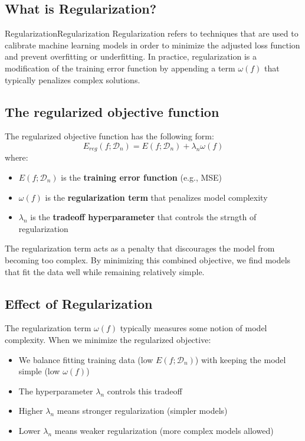 \documentclass[a4paper]{article}
\theoremstyle{definition}
\begin{document}
\subsection{What is Regularization?}
\begin{definition}{Regularization}{Regularization}
Regularization refers to techniques that are used to calibrate machine learning 
models in order to minimize the adjusted loss function and prevent overfitting 
or underfitting.
\vspace{1em}
\noindent
\newline
In practice, regularization is a modification of the training error function by appending a term 
\( \omega(f) \) that typically penalizes complex solutions.
\end{definition}
\subsection{The regularized objective function}
The regularized objective function has the following form:
\[
  E_{reg} (f;\mathcal{D}_n) = E(f;\mathcal{D}_n) + \lambda_n \omega(f)
\]
where:
\begin{itemize}
    \item \( E(f;\mathcal{D}_n) \) is the \textbf{training error function} (e.g., MSE)
    \item \( \omega(f) \) is the \textbf{regularization term} that penalizes model complexity 
    \item \( \lambda_n \) is the \textbf{tradeoff hyperparameter} that controls the strngth of regularization
\end{itemize}
The regularization term acts as a penalty that discourages the model from becoming too complex.
By minimizing this combined objective, we find models that fit the data well while remaining relatively simple.
\subsection{Effect of Regularization}
The regularization term \( \omega(f) \) typically measures some notion of model complexity. When we minimize the regularized objective:
\begin{itemize}
    \item We balance fitting training data (low \(E(f;\mathcal{D}_n) \)) with keeping the model simple (low \( \omega(f) \))
    \item The hyperparameter \( \lambda_n \) controls this tradeoff 
    \item Higher \( \lambda_n \) means stronger regularization (simpler models)
    \item Lower \( \lambda_n \) means weaker regularization (more complex models allowed)
\end{itemize}
\end{document}
